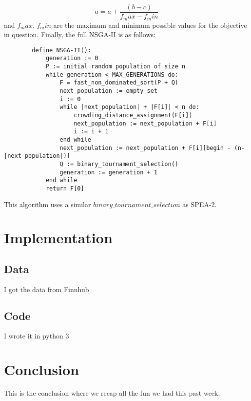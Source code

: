 \documentclass{article}
\begin{document}
    \begin{equation*}
        a = a + \dfrac{(b - c)}{f_max - f_min}
    \end{equation*}
    and \(f_max\), \(f_min\) are the maximum and minimum possible values for the objective in question. 
    Finally, the full NSGA-II is as follows:
    \begin{lstlisting}
        define NSGA-II():
            generation := 0
            P := initial random population of size n
            while generation < MAX_GENERATIONS do:
                F = fast_non_dominated_sort(P + Q)
                next_population := empty set
                i := 0
                while |next_population| + |F[i]| < n do:
                    crowding_distance_assignment(F[i])
                    next_population := next_population + F[i]
                    i := i + 1
                end while
                next_population := next_population + F[i][begin - (n-|next_population|)]
                Q := binary_tournament_selection()
                generation := generation + 1
            end while
            return F[0]
    \end{lstlisting}
    This algorithm uses a similar \(binary\_tournament\_selection\) as SPEA-2.
    \cite{DebPratapAgarwalMeyarivan} \cite{PonsichJaimesCoello}
    \section{Implementation}
    \subsection{Data}
    I got the data from Finnhub
    \subsection{Code}
    I wrote it in python 3
    \section{Conclusion}
    This is the conclusion where we recap all the fun we had this past week.
    \newpage
    \printbibliography
\end{document}
